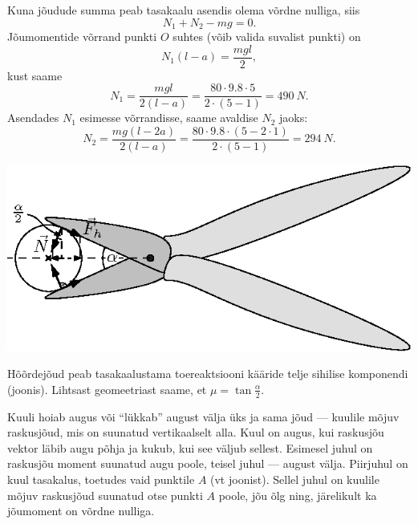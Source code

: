 \documentclass[10pt]{article}
\begin{document}
{Kuna jõudude summa peab tasakaalu asendis olema võrdne nulliga, siis
\[
N_1 + N_2 - mg = 0.
\]
Jõumomentide võrrand punkti $O$ suhtes (võib valida suvalist punkti) on
\[
N_{1}(l-a)=\frac{m g l}{2},
\]
kust saame
\[
N_{1}=\frac{m g l}{2(l-a)}=\frac{80 \cdot \num{9,8} \cdot 5}{2 \cdot(5-1)}=\SI{490}{N}.
\]
Asendades $N_1$ esimesse võrrandisse, saame avaldise $N_2$ jaoks:
\[
N_{2}=\frac{m g(l-2 a)}{2(l-a)}=\frac{80 \cdot \num{9,8} \cdot(5-2 \cdot 1)}{2 \cdot(5-1)}=\SI{294}{N}.
\]
\probend
\bigskip


\solu
\begin{center}
	\includegraphics[width=0.9\linewidth]{2009-v3g-01-G_nyrinenud_kaarid_lah.eps}
\end{center}

Hõõrdejõud peab tasakaalustama toereaktsiooni kääride telje sihilise komponendi (joonis). Lihtsast geomeetriast saame, et $\mu = \tan \frac{\alpha}{2}$.
\probend
\bigskip


\solu
Kuuli hoiab augus või \enquote{lükkab} august välja üks ja sama jõud --- kuulile mõjuv raskusjõud, mis on suunatud vertikaalselt alla. Kuul on augus, kui raskusjõu vektor läbib augu põhja ja kukub, kui see väljub sellest. Esimesel juhul on raskusjõu moment suunatud augu poole, teisel juhul --- august välja. Piirjuhul on kuul tasakalus, toetudes vaid punktile $A$ (vt joonist). Sellel juhul on kuulile mõjuv raskusjõud suunatud otse punkti $A$ poole, jõu õlg ning, järelikult ka jõumoment on võrdne nulliga.

}
\end{document}
